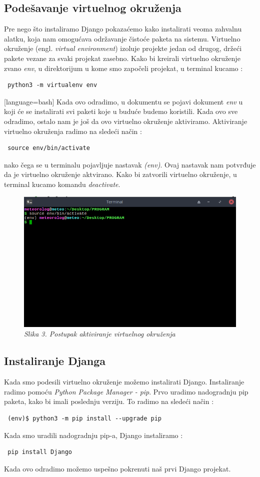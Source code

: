 \documentclass[12pt]{article}
\begin{document}
\subsection{Podešavanje virtuelnog okruženja}
Pre nego što instaliramo Django pokazaćemo kako instalirati veoma zahvalnu alatku, koja nam omogućava održavanje čistoće paketa na sistemu. Virtuelno okruženje (engl. \textsl{virtual environment}) izoluje projekte jedan od drugog, držeći pakete vezane za svaki projekat zasebno. Kako bi kreirali virtuelno okruženje zvano \textsl{env}, u direktorijum u kome smo započeli projekat, u terminal kucamo :
\begin{lstlisting}
 python3 -m virtualenv env
\end{lstlisting} [language=bash]
Kada ovo odradimo, u dokumentu se pojavi dokument \textsl{env} u koji će se instalirati svi paketi koje u buduće budemo koristili. Kada ovo sve odradimo, ostalo nam je još da ovo virtuelno okruženje aktiviramo. Aktiviranje virtuelno okruženja radimo na sledeći način :
\begin{lstlisting}
 source env/bin/activate
\end{lstlisting} 
nako čega se u terminalu pojavljuje nastavak \textsl{(env)}. Ovaj nastavak nam potvrđuje da je virtuelno okruženje aktvirano. Kako bi zatvorili virtuelno okruženje, u terminal kucamo komandu \textsl{deactivate}. 
\begin{figure}[h!]
\centering
\includegraphics[width=1.\linewidth]{env.png}
\caption*{\textsl{Slika 3. Postupak aktiviranje virtuelnog okruženja}}
\end{figure}

\subsection{Instaliranje Djanga}
Kada smo podesili virtuelno okruženje možemo instalirati Django.  Instaliranje radimo pomoću  \textsl{Python Package Manager - pip}. Prvo uradimo nadogradnju pip paketa, kako bi imali poslednju verziju. To radimo na sledeći način :
\begin{lstlisting}
 (env)$ python3 -m pip install --upgrade pip
\end{lstlisting} 
Kada smo uradili nadogradnju pip-a, Django instaliramo :

\begin{lstlisting}
 pip install Django
\end{lstlisting} 
Kada ovo odradimo možemo uspešno pokrenuti naš prvi Django projekat.
\end{document}
